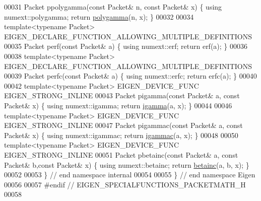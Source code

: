 \begin{DoxyCode}
00031 Packet ppolygamma(\textcolor{keyword}{const} Packet& n, \textcolor{keyword}{const} Packet& x) \{ \textcolor{keyword}{using} numext::polygamma; \textcolor{keywordflow}{return} 
      \hyperlink{namespace_eigen_ae3b47a13a0699f5dbaa0623c11333dca}{polygamma}(n, x); \}
00032 
00034 \textcolor{keyword}{template}<\textcolor{keyword}{typename} Packet> EIGEN\_DECLARE\_FUNCTION\_ALLOWING\_MULTIPLE\_DEFINITIONS
00035 Packet perf(\textcolor{keyword}{const} Packet& a) \{ \textcolor{keyword}{using} numext::erf; \textcolor{keywordflow}{return} erf(a); \}
00036 
00038 \textcolor{keyword}{template}<\textcolor{keyword}{typename} Packet> EIGEN\_DECLARE\_FUNCTION\_ALLOWING\_MULTIPLE\_DEFINITIONS
00039 Packet perfc(\textcolor{keyword}{const} Packet& a) \{ \textcolor{keyword}{using} numext::erfc; \textcolor{keywordflow}{return} erfc(a); \}
00040 
00042 \textcolor{keyword}{template}<\textcolor{keyword}{typename} Packet> EIGEN\_DEVICE\_FUNC EIGEN\_STRONG\_INLINE
00043 Packet pigamma(\textcolor{keyword}{const} Packet& a, \textcolor{keyword}{const} Packet& x) \{ \textcolor{keyword}{using} numext::igamma; \textcolor{keywordflow}{return} 
      \hyperlink{namespace_eigen_af5aa651137636b1cdbd27de1cfe91148}{igamma}(a, x); \}
00044 
00046 \textcolor{keyword}{template}<\textcolor{keyword}{typename} Packet> EIGEN\_DEVICE\_FUNC EIGEN\_STRONG\_INLINE
00047 Packet pigammac(\textcolor{keyword}{const} Packet& a, \textcolor{keyword}{const} Packet& x) \{ \textcolor{keyword}{using} numext::igammac; \textcolor{keywordflow}{return} 
      \hyperlink{namespace_eigen_a1abaa2ff8c7b1871eaf026a47c6bbf3b}{igammac}(a, x); \}
00048 
00050 \textcolor{keyword}{template}<\textcolor{keyword}{typename} Packet> EIGEN\_DEVICE\_FUNC EIGEN\_STRONG\_INLINE
00051 Packet pbetainc(\textcolor{keyword}{const} Packet& a, \textcolor{keyword}{const} Packet& b,\textcolor{keyword}{const} Packet& x) \{ \textcolor{keyword}{using} numext::betainc; \textcolor{keywordflow}{return} 
      \hyperlink{namespace_eigen_a726eae91d4e91d8e25cbe55fffa6a92f}{betainc}(a, b, x); \}
00052 
00053 \} \textcolor{comment}{// end namespace internal}
00054 
00055 \} \textcolor{comment}{// end namespace Eigen}
00056 
00057 \textcolor{preprocessor}{#endif // EIGEN\_SPECIALFUNCTIONS\_PACKETMATH\_H}
00058 
\end{DoxyCode}

